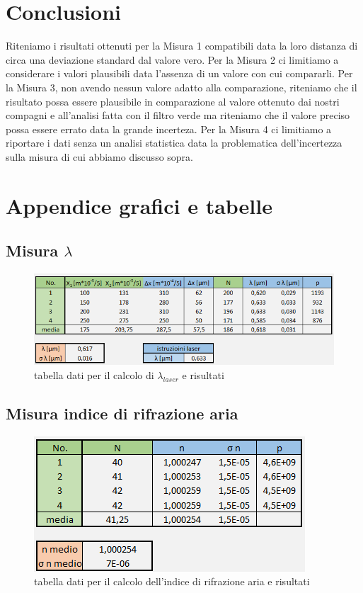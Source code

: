 \documentclass{article}
\begin{document}
\section{Conclusioni}
Riteniamo i risultati ottenuti per la Misura 1 compatibili data la loro distanza di circa una deviazione standard dal valore vero. Per la Misura 2 ci limitiamo a considerare i valori plausibili data l'assenza di un valore con cui compararli. Per la Misura 3, non avendo nessun valore adatto alla comparazione, riteniamo che il risultato possa essere plausibile in comparazione al valore ottenuto dai nostri compagni e all'analisi fatta con il filtro verde ma riteniamo che il valore preciso possa essere errato data la grande incerteza. Per la Misura 4 ci limitiamo a riportare i dati senza un analisi statistica data la problematica dell'incertezza sulla misura di cui abbiamo discusso sopra.




\section{Appendice grafici e tabelle}
\subsection{Misura $\lambda$}

\begin{figure}[h!]
  \centering
  \includegraphics[width=1\linewidth]{IM tabella lambda}
  \caption{tabella dati per il calcolo di $\lambda_{laser}$ e risultati}
\end{figure}

\subsection{Misura indice di rifrazione aria}

\begin{figure}[h!]
  \centering
  \includegraphics[width=0.6\linewidth]{IM tabella n}
  \caption{tabella dati per il calcolo dell'indice di rifrazione aria e risultati}
\end{figure}
\end{document}

